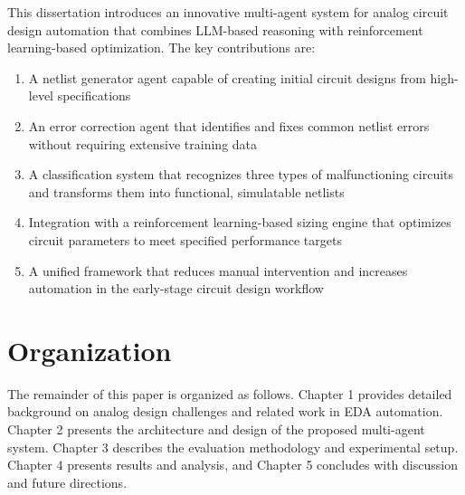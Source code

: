 This dissertation introduces an innovative multi-agent system for analog circuit design automation that combines LLM-based reasoning with reinforcement learning-based optimization. The key contributions are:

\begin{enumerate}
    \item A netlist generator agent capable of creating initial circuit designs from high-level specifications
    \item An error correction agent that identifies and fixes common netlist errors without requiring extensive training data
    \item A classification system that recognizes three types of malfunctioning circuits and transforms them into functional, simulatable netlists
    \item Integration with a reinforcement learning-based sizing engine that optimizes circuit parameters to meet specified performance targets
    \item A unified framework that reduces manual intervention and increases automation in the early-stage circuit design workflow
\end{enumerate}

\section{Organization}

The remainder of this paper is organized as follows. Chapter 1 provides detailed background on analog design challenges and related work in EDA automation. Chapter 2 presents the architecture and design of the proposed multi-agent system. Chapter 3 describes the evaluation methodology and experimental setup. Chapter 4 presents results and analysis, and Chapter 5 concludes with discussion and future directions.

